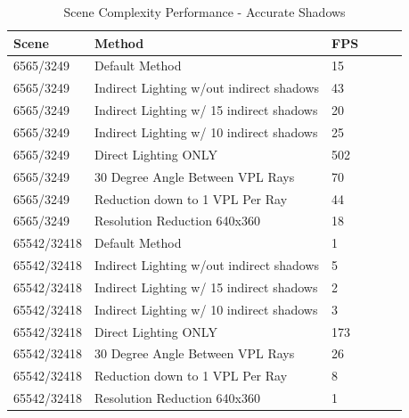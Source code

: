 \begin{table}[h!]
	\caption{Scene Complexity Performance - Accurate Shadows}
	\begin{center}
	    \begin{tabular}{ | l | l | l | l | l | l |}
	    \hline
	    Scene & Method & FPS\\ \hline
	    6565/3249 & Default Method & 15\\ \hline
	    6565/3249 & Indirect Lighting w/out indirect shadows & 43\\ \hline
	    6565/3249 & Indirect Lighting w/ 15 indirect shadows & 20\\ \hline
	    6565/3249 & Indirect Lighting w/ 10 indirect shadows & 25\\ \hline
	    6565/3249 & Direct Lighting ONLY & 502\\ \hline
	    6565/3249 & 30 Degree Angle Between VPL Rays & 70\\ \hline
	    6565/3249 & Reduction down to 1 VPL Per Ray & 44\\ \hline
	    6565/3249 & Resolution Reduction 640x360 & 18\\ \hline
	    \hline
	    \hline
	    65542/32418 & Default Method & 1\\ \hline
	    65542/32418 & Indirect Lighting w/out indirect shadows & 5\\ \hline
	    65542/32418 & Indirect Lighting w/ 15 indirect shadows & 2\\ \hline
	    65542/32418 & Indirect Lighting w/ 10 indirect shadows & 3\\ \hline
	    65542/32418 & Direct Lighting ONLY & 173\\ \hline
	    65542/32418 & 30 Degree Angle Between VPL Rays & 26\\ \hline
	    65542/32418 & Reduction down to 1 VPL Per Ray & 8\\ \hline
	    65542/32418 & Resolution Reduction 640x360 & 1\\ \hline
	    \end{tabular}
	\end{center}
	\label{table:tech1Complex}
\end{table}

